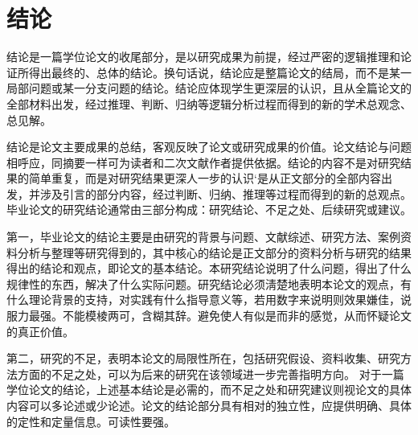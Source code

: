 \cleardoublepage{}
{}
\chapter*{结论}

结论是一篇学位论文的收尾部分，是以研究成果为前提，经过严密的逻辑推理和论证所得出最终的、总体的结论。换句话说，结论应是整篇论文的结局，而不是某一局部问题或某一分支问题的结论。结论应体现学生更深层的认识，且从全篇论文的全部材料出发，经过推理、判断、归纳等逻辑分析过程而得到的新的学术总观念、总见解。

结论是论文主要成果的总结，客观反映了论文或研究成果的价值。论文结论与问题相呼应，同摘要一样可为读者和二次文献作者提供依据。结论的内容不是对研究结果的简单重复，而是对研究结果更深人一步的认识‘是从正文部分的全部内容出发，并涉及引言的部分内容，经过判断、归纳、推理等过程而得到的新的总观点。毕业论文的研究结论通常由三部分构成：研究结论、不足之处、后续研究或建议。

第一，毕业论文的结论主要是由研究的背景与问题、文献综述、研究方法、案例资料分析与整理等研究得到的，其中核心的结论是正文部分的资料分析与研究的结果得出的结论和观点，即论文的基本结论。本研究结论说明了什么问题，得出了什么规律性的东西，解决了什么实际问题。研究结论必须淸楚地表明本论文的观点，有什么理论背景的支持，对实践有什么指导意义等，若用数字来说明则效果嫌佳，说服力最强。不能模棱两可，含糊其辞。避免使人有似是而非的感觉，从而怀疑论文的真正价值。 

第二，研究的不足，表明本论文的局限性所在，包括研究假设、资料收集、研究方法方面的不足之处，可以为后来的研究在该领域进一步完善指明方向。
对于一篇学位论文的结论，上述基本结论是必需的，而不足之处和研究建议则视论文的具体内容可以多论述或少论述。论文的结论部分具有相对的独立性，应提供明确、具体的定性和定量信息。可读性要强。
